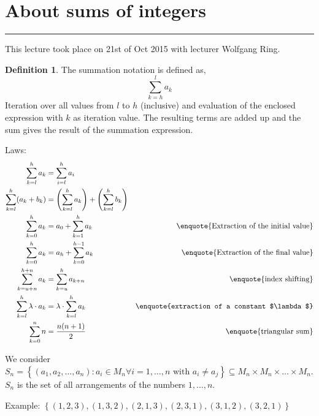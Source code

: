 \documentclass[a4paper,landscape,twocolumn]{article}
\theoremstyle{definition}
\newtheorem{defi}{Definition}
\newcommand\set[1]{\left\{#1\right\}}
\newcommand\meta[3]{\hrule{} This #1 took place on #2 with lecturer #3.\par}
\begin{document}
\section{About sums of integers}
\meta{lecture}{21st of Oct 2015}{Wolfgang Ring}

\begin{defi}
  The summation notation is defined as,
  \[ \sum_{k=h}^{l} a_k \]
  Iteration over all values from $l$ to $h$ (inclusive) and evaluation of
  the enclosed expression with $k$ as iteration value. The resulting terms
  are added up and the sum gives the result of the summation expression.
\end{defi}

Laws:
\begin{align}
    \sum_{k=l}^{h} a_k &= \sum_{i=l}^h a_i \\
    \sum_{k=l}^{h} (a_k + b_k)
        &= \left(\sum_{k=l}^h a_k\right) + \left(\sum_{k=l}^h b_k\right) \\
    \sum_{k=0}^{h} a_k
        &= a_0 + \sum_{k=1}^{h} a_k
        & \text{\enquote{Extraction of the initial value}} \\
    \sum_{k=0}^{h} a_k
        &= a_{h} + \sum_{k=0}^{h-1} a_k
        & \text{\enquote{Extraction of the final value}} \\
    \sum_{k=u+n}^{h+n} a_k
        &= \sum_{k=u}^{h} a_{k+n}
        & \text{\enquote{index shifting}} \\
    \sum_{k=l}^h \lambda \cdot a_k
        &= \lambda \cdot \sum_{k=l}^h a_k
        & \text{\enquote{extraction of a constant $\lambda$}} \\
    \sum_{k=0}^n n
        &= \frac{n (n+1)}{2}
        & \text{\enquote{triangular sum}}
\end{align}

We consider $S_n = \set{(a_1, a_2, \ldots, a_n): a_i \in M_n \forall i = 1, \ldots, n
\text{ with } a_i \neq a_j} \subseteq M_n \times M_n \times \dots \times M_n$.
$S_n$ is the set of all arrangements of the numbers $1, \ldots, n$.

Example: $\set{(1,2,3), (1, 3, 2), (2, 1, 3), (2, 3, 1), (3, 1, 2), (3, 2, 1)}$
\end{document}
